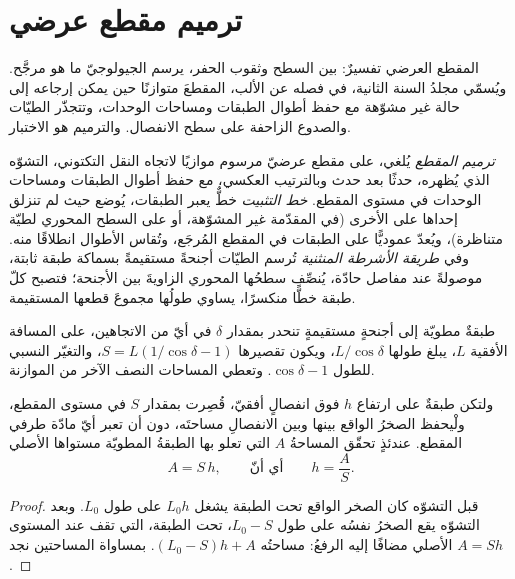 \section{ترميم مقطع عرضي}\label{sec:b3:structural-analysis:restoration}

المقطع العرضي تفسيرٌ: بين السطح وثقوب الحفر،
يرسم الجيولوجيّ ما هو مرجَّح. ويُسمّي مجلدُ السنة الثانية، في فصله عن الألب،
المقطعَ متوازنًا حين يمكن إرجاعه إلى حالة غير مشوّهة
مع حفظ أطوال الطبقات ومساحات الوحدات، وتتجذّر الطيّات والصدوع
الزاحفة على سطح الانفصال. والترميم هو الاختبار.

\begin{definition}\label{def:b3:structural-analysis:restoration}
\emph{ترميم المقطع} يُلغي، على
مقطع عرضيّ مرسوم موازيًا لاتجاه النقل التكتوني، التشوّه الذي يُظهره،
حدثًا بعد حدث وبالترتيب العكسي، مع حفظ
أطوال الطبقات ومساحات الوحدات في مستوى المقطع.
\emph{خط التثبيت} خطٌّ يعبر الطبقات، يُوضع حيث لم تنزلق
إحداها على الأخرى (في المقدّمة غير المشوّهة، أو على السطح المحوري لطيّة متناظرة)،
ويُعدّ عموديًّا على الطبقات في المقطع المُرجَع،
وتُقاس الأطوال انطلاقًا منه. وفي \emph{طريقة الأشرطة المنثنية} تُرسم الطيّات أجنحةً مستقيمةً
بسماكة طبقة ثابتة، موصولةً عند مفاصل حادّة، يُنصِّف سطحُها المحوري
الزاويةَ بين الأجنحة؛ فتصبح كلّ طبقة خطًّا منكسرًا،
يساوي طولُها
مجموعَ قطعها المستقيمة.
\end{definition}

طبقةٌ مطويّة إلى أجنحةٍ مستقيمةٍ تنحدر بمقدار $\delta$ في أيّ من الاتجاهين، على
المسافة الأفقية $L$، يبلغ طولها $L/\cos\delta$، ويكون تقصيرها
$S = L(1/\cos\delta - 1)$، والتغيّر النسبي للطول $\cos\delta - 1$.
وتعطي المساحات النصف الآخر من الموازنة.

\begin{proposition}\label{prop:b3:structural-analysis:detachment}
ولتكن طبقةٌ على ارتفاع $h$ فوق انفصالٍ أفقيّ، قُصِرت بمقدار $S$
في مستوى المقطع، ولْيحفظ الصخرُ الواقع بينها وبين الانفصالِ مساحتَه،
دون أن تعبر أيّ مادّة طرفي المقطع. عندئذٍ
تحقّق المساحةُ $A$ التي تعلو بها الطبقةُ المطويّة مستواها الأصلي
\[
  A = S\,h , \qquad\text{أي أنّ}\qquad h = \frac AS .
\]
\end{proposition}

\begin{proof}
قبل التشوّه كان الصخر الواقع تحت الطبقة يشغل $L_0 h$ على
طول $L_0$. وبعد التشوّه يقع الصخرُ نفسُه على طول $L_0 - S$، تحت
الطبقة، التي تقف عند المستوى الأصلي مضافًا إليه الرفعُ: مساحتُه
$(L_0 - S)h + A$. بمساواة المساحتين نجد $A = Sh$.
\end{proof}

